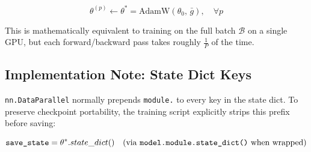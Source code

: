 \documentclass[12pt, a4paper]{article}
\begin{document}
\begin{equation}
  \theta^{(p)} \leftarrow \theta^* = \text{AdamW}(\theta_0,\, \bar{g}), \quad \forall p
\end{equation}

This is mathematically equivalent to training on the full batch $\mathcal{B}$ on a single GPU, but each forward/backward pass takes roughly $\frac{1}{P}$ of the time.

\subsection{Implementation Note: State Dict Keys}

\texttt{nn.DataParallel} normally prepends \texttt{module.} to every key in the state dict. To preserve checkpoint portability, the training script explicitly strips this prefix before saving:

\begin{equation}
  \texttt{save\_state} = \theta^*.state\_dict()
  \quad\text{(via \texttt{model.module.state\_dict()} when wrapped)}
\end{equation}
\end{document}
